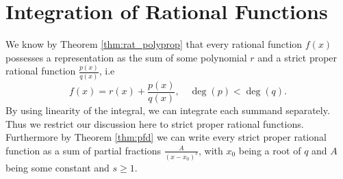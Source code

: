 

\section{Integration of Rational Functions}
We know by Theorem \ref{thm:rat_polyprop} that every rational function $f(x)$ possesses a representation as the sum of some polynomial $r$ and a strict proper rational function $\frac{p(x)}{q(x)}$, i.e
$$
f(x) = r(x) + \frac{p(x)}{q(x)},\quad \deg(p)<\deg(q).
$$
By using linearity of the integral, we can integrate each summand separately. Thus we restrict our discussion here to strict proper rational functions. Furthermore by Theorem \ref{thm:pfd} we can write every strict proper rational function as a sum of partial fractions $\frac{A}{(x-x_{0})^{s}}$, with $x_{0}$ being a root of $q$ and $A$ being some constant and $s\geq 1$.

